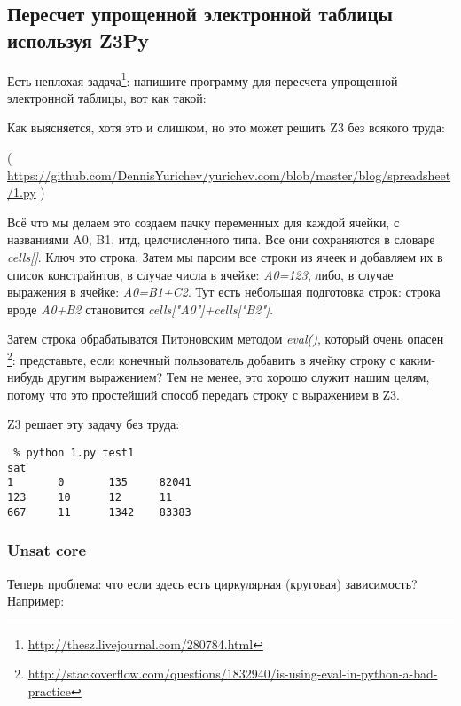 \subsection{Пересчет упрощенной электронной таблицы используя Z3Py}

Есть неплохая задача\footnote{\url{http://thesz.livejournal.com/280784.html}}:
напишите программу для пересчета упрощенной электронной таблицы, вот как такой:



Как выясняется, хотя это и слишком, но это может решить Z3 без всякого труда:



( \url{https://github.com/DennisYurichev/yurichev.com/blob/master/blog/spreadsheet/1.py} )

Всё что мы делаем это создаем пачку переменных для каждой ячейки, с названиями 
A0, B1, итд, целочисленного типа.
Все они сохраняются в словаре \textit{cells[]}.
Ключ это строка.
Затем мы парсим все строки из ячеек и добавляем их в список констрайнтов, в случае числа в ячейке: \textit{A0=123},
либо, в случае выражения в ячейке: \textit{A0=B1+C2}.
Тут есть небольшая подготовка строк: строка вроде \textit{A0+B2} становится \textit{cells["A0"]+cells["B2"]}.

Затем строка обрабатыватся Питоновским методом \textit{eval()}, который очень опасен
\footnote{\url{http://stackoverflow.com/questions/1832940/is-using-eval-in-python-a-bad-practice}}:
представьте, если конечный пользователь добавить в ячейку строку с каким-нибудь другим выражением?
Тем не менее, это хорошо служит нашим целям, потому что это простейший способ передать строку с выражением в Z3.

Z3 решает эту задачу без труда:

\begin{lstlisting}
 % python 1.py test1
sat
1       0       135     82041
123     10      12      11
667     11      1342    83383
\end{lstlisting}

\subsubsection{Unsat core}

Теперь проблема: что если здесь есть циркулярная (круговая) зависимость? Например:




